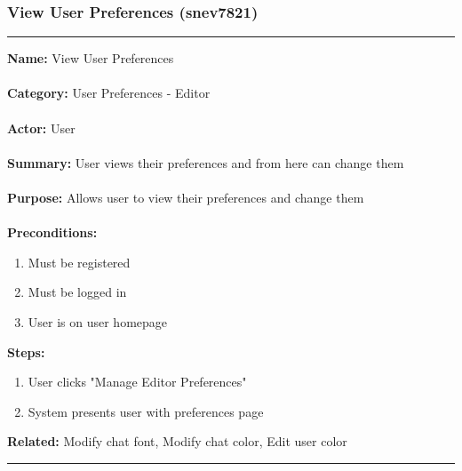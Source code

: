 \documentclass[11pt]{report}
\begin{document}
\subsubsection{View User Preferences (snev7821)}
\vspace{2pt}
\hrule
\vspace{8pt}
	\noindent\textbf{Name:} View User Preferences \\ \\
	\textbf{Category:} User Preferences - Editor  \\ \\
	\textbf{Actor:} User \\ \\
	\textbf{Summary:} User views their preferences and from here can change them \\ \\
	\textbf{Purpose:} Allows user to view their preferences and change them \\ \\
	\textbf{Preconditions:} 
	\begin{enumerate}
		\item Must be registered
		\item Must be logged in
		\item User is on user homepage
	\end{enumerate}
	\textbf{Steps:}
	\begin{enumerate}
		\item User clicks "Manage Editor Preferences"
		\item System presents user with preferences page
	\end{enumerate}
	\textbf{Related:} Modify chat font, Modify chat color, Edit user color
\vspace{8pt}
\hrule
\newpage
\end{document}
